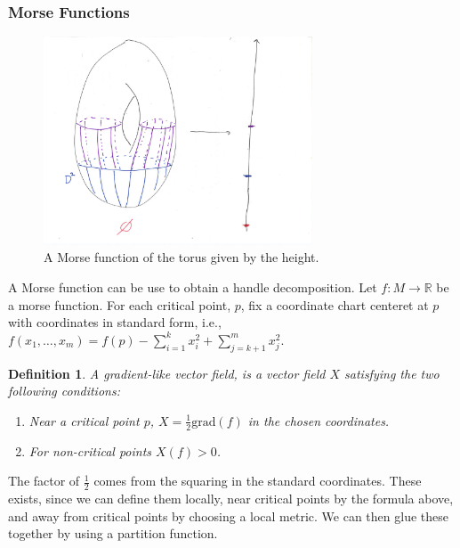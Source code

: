 \documentclass{article}
\newtheorem{definition}[theorem]{Definition}
\newtheorem{proposed work}[theorem]{Proposed Work}
\theoremstyle{definition}
\begin{document}
\subsubsection{Morse Functions}
\begin{figure}[h]
\includegraphics[width=8cm]{torusmorse.pdf}
\caption{A Morse function of the torus given by the height. \label{TorusMorse}}
\end{figure}
A Morse function can be use to obtain a handle decomposition. Let $f: M\to \mathbb{R}$ be a morse function. For each critical point, $p$, fix a coordinate chart centeret at $p$ with coordinates in standard form, i.e., $f(x_1,\ldots,x_m)=f(p)-\sum_{i=1}^k x_i^2+\sum_{j=k+1}^mx_j^2$. 
\begin{definition}
A gradient-like vector field, is a vector field $X$ satisfying the two following conditions:
\begin{enumerate}
\item Near a critical point $p$, $X=\frac{1}{2}\mathrm{grad}(f)$ in the chosen coordinates.
\item For non-critical points $X(f)>0$.
\end{enumerate}
\end{definition}
The factor of $\frac{1}{2}$ comes from the squaring in the standard coordinates. These exists, since we can define them locally, near critical points by the formula above, and away from critical points by choosing a local metric. We can then glue these together by using a partition function.
\end{document}
